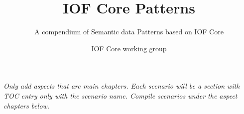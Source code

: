\documentclass{tudelft-report}
\begin{document}
\frontmatter

\title{IOF Core Patterns}
\subtitle{A compendium of Semantic data Patterns based on IOF Core}
\author{IOF Core working group}

\subject{Draft} %






\tableofcontents




\mainmatter




\textit{
Only add aspects that are main chapters. Each scenario will be a section with TOC entry only with the scenario name. Compile scenarios under the aspect chapters below.
}
















\setcounter{biburlnumpenalty}{7000}
\setcounter{biburllcpenalty}{7000}
\setcounter{biburlucpenalty}{7000}

\printbibliography[heading=bibintoc,title=References]


\appendix




\end{document}
